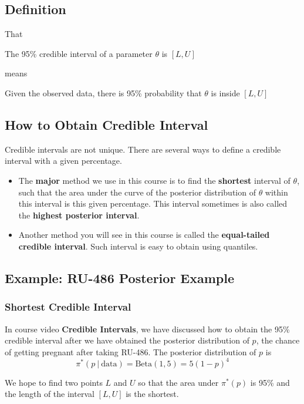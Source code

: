 \documentclass{article}
\begin{document}
\subsection{Definition}
That
\begin{displayquote}
	The 95\% credible interval of a parameter $\theta$ is $[L, U]$
\end{displayquote}
means
\begin{displayquote}
	Given the observed data, there is 95\% probability that $\theta$ is inside $[L,U]$
\end{displayquote}

\subsection{How to Obtain Credible Interval}

Credible intervals are not unique. There are several ways to define a credible interval with a given percentage. 
\begin{itemize}
	\item The \textbf{major} method we use in this course is to find the \textbf{shortest} interval of $\theta$, such that the area under the curve of the posterior distribution of $\theta$ within this interval is this given percentage. This interval sometimes is also called the \textbf{highest posterior interval}.
	
	\item Another method you will see in this course is called the \textbf{equal-tailed credible interval}. Such interval is easy to obtain using quantiles.
\end{itemize}

\subsection*{Example: RU-486 Posterior Example}

\subsubsection*{Shortest Credible Interval}

In course video \textbf{Credible Intervals}, we have discussed how to obtain the 95\% credible interval after we have obtained the posterior distribution of $p$, the chance of getting pregnant after taking RU-486. The posterior distribution of $p$ is 
$$\pi^*(p~|~\text{data}) = \text{Beta}(1, 5)= 5(1-p)^4$$

We hope to find two points $L$ and $U$ so that the area under $\pi^*(p)$ is 95\% and the length of the interval $[L, U]$ is the shortest.\\
\end{document}
